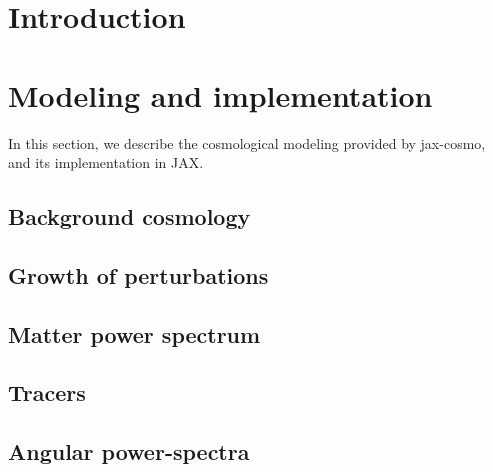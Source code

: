\documentclass[final,5p,times,twocolumn,authoryear]{elsarticle}
\begin{document}


\section{Introduction}



\section{Modeling and implementation}

In this section, we describe the cosmological modeling provided by jax-cosmo, and its implementation in JAX.


\subsection{Background cosmology}


\subsection{Growth of perturbations}


\subsection{Matter power spectrum}


\subsection{Tracers}


\subsection{Angular power-spectra}
\end{document}
